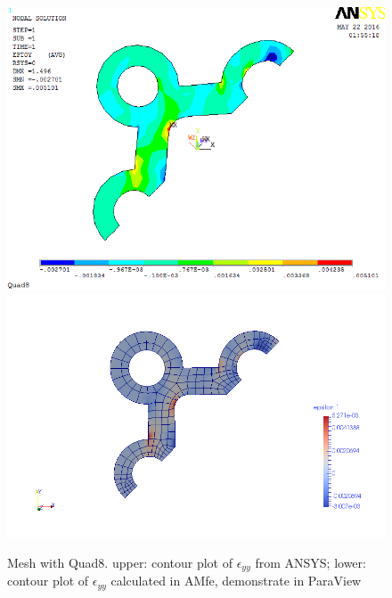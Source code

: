 \begin{figure}[htbp]
	\begin{center}
		\includegraphics[width=13cm,clip]{Quad8_Eyy.png} 		
		\includegraphics[width=13cm,clip]{Quad8_Eyy_P.png} 		
		\caption{Mesh with Quad8. upper: contour plot of $\epsilon_{yy}$ from ANSYS; lower: contour plot of $\epsilon_{yy}$ calculated in AMfe, demonstrate in ParaView} \label{fig: Quad8_Eyy}
	\end{center}
\end{figure}
\clearpage 

